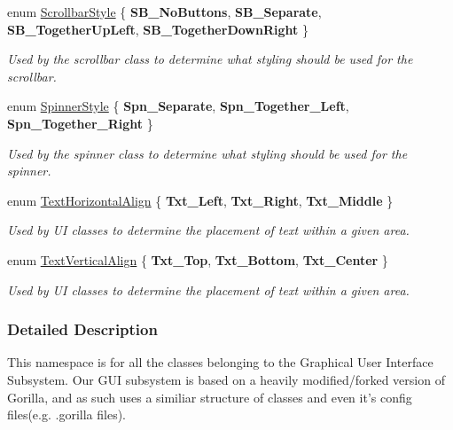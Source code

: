 \begin{DoxyCompactItemize}
enum \hyperlink{namespaceMezzanine_1_1UI_a5998a9bf372a7e92605c0c461736e763}{ScrollbarStyle} \{ {\bfseries SB\_\-NoButtons}, 
{\bfseries SB\_\-Separate}, 
{\bfseries SB\_\-TogetherUpLeft}, 
{\bfseries SB\_\-TogetherDownRight}
 \}
\begin{DoxyCompactList}\small\item\em Used by the scrollbar class to determine what styling should be used for the scrollbar. \item\end{DoxyCompactList}\item 
enum \hyperlink{namespaceMezzanine_1_1UI_a62462d4df783dcdda77e1590a96bc6d6}{SpinnerStyle} \{ {\bfseries Spn\_\-Separate}, 
{\bfseries Spn\_\-Together\_\-Left}, 
{\bfseries Spn\_\-Together\_\-Right}
 \}
\begin{DoxyCompactList}\small\item\em Used by the spinner class to determine what styling should be used for the spinner. \item\end{DoxyCompactList}\item 
enum \hyperlink{namespaceMezzanine_1_1UI_aebbd46e62bb20d958f1915c1ec6cc549}{TextHorizontalAlign} \{ {\bfseries Txt\_\-Left}, 
{\bfseries Txt\_\-Right}, 
{\bfseries Txt\_\-Middle}
 \}
\begin{DoxyCompactList}\small\item\em Used by UI classes to determine the placement of text within a given area. \item\end{DoxyCompactList}\item 
enum \hyperlink{namespaceMezzanine_1_1UI_ab35e3845e2541698245262cc17147ae9}{TextVerticalAlign} \{ {\bfseries Txt\_\-Top}, 
{\bfseries Txt\_\-Bottom}, 
{\bfseries Txt\_\-Center}
 \}
\begin{DoxyCompactList}\small\item\em Used by UI classes to determine the placement of text within a given area. \item\end{DoxyCompactList}\end{DoxyCompactItemize}


\subsubsection{Detailed Description}
This namespace is for all the classes belonging to the Graphical User Interface Subsystem. Our GUI subsystem is based on a heavily modified/forked version of Gorilla, and as such uses a similiar structure of classes and even it's config files(e.g. .gorilla files). 

